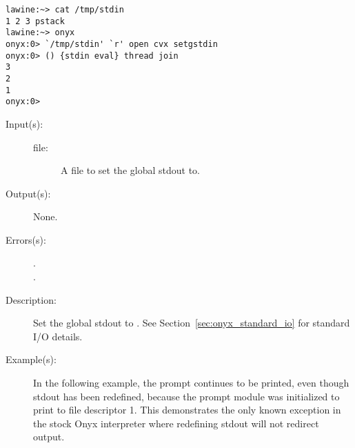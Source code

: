 \begin{description}
\begin{description}
\begin{verbatim}
lawine:~> cat /tmp/stdin
1 2 3 pstack
lawine:~> onyx
onyx:0> `/tmp/stdin' `r' open cvx setgstdin
onyx:0> () {stdin eval} thread join
3
2
1
onyx:0>
		\end{verbatim}
	\end{description}
\label{systemdict:setgstdout}
\item[{\onyxop{file}{setgstdout}{--}}: ]
	\begin{description}\item[]
	\item[Input(s): ]
		\begin{description}\item[]
		\item[file: ]
			A file to set the global stdout to.
		\end{description}
	\item[Output(s): ] None.
	\item[Errors(s): ]
		\begin{description}\item[]
		\item[.]
		\item[.]
		\end{description}
	\item[Description: ]
		Set the global stdout to .  See
		Section~\ref{sec:onyx_standard_io} for standard I/O details.
	\item[Example(s): ]
		In the following example, the prompt continues to be printed,
		even though stdout has been redefined, because the prompt module
		was initialized to print to file descriptor 1.  This
		demonstrates the only known exception in the stock Onyx
		interpreter where redefining stdout will not redirect output.
\begin{verbatim}


\end{verbatim}
\end{description}
\end{description}
